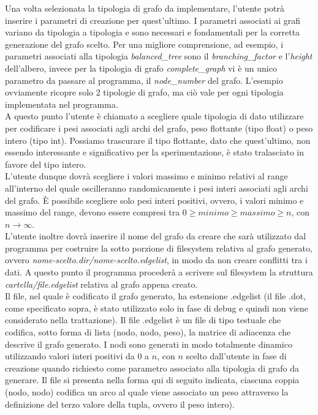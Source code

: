 Una volta selezionata la tipologia di grafo da implementare, l'utente potrà inserire i parametri di creazione per quest'ultimo. I parametri associati ai grafi variano da tipologia a tipologia e sono necessari e fondamentali per la corretta generazione del grafo scelto. Per una migliore comprensione, ad esempio, i parametri associati alla tipologia \textit{balanced\_tree} sono il \textit{branching\_factor} e l'\textit{height} dell'albero, invece per la tipologia di grafo \textit{complete\_graph} vi è un unico parametro da passare al programma, il \textit{node\_number} del grafo. L'esempio ovviamente ricopre solo 2 tipologie di grafo, ma ciò vale per ogni tipologia implementata nel programma.\\
A questo punto l'utente è chiamato a scegliere quale tipologia di dato utilizzare per codificare i pesi associati agli archi del grafo, peso flottante (tipo float) o peso intero (tipo int). Possiamo trascurare il tipo flottante, dato che quest'ultimo, non essendo interessante e significativo per la sperimentazione, è stato tralasciato in favore del tipo intero.\\
L'utente dunque dovrà scegliere i valori massimo e minimo relativi al range all'interno del quale oscilleranno randomicamente i pesi interi associati agli archi del grafo. È possibile scegliere solo pesi interi positivi, ovvero, i valori minimo e massimo del range, devono essere compresi tra \(0 \geq minimo \geq massimo \geq n\), con \(n\to\infty\).\\
L'utente inoltre dovrà inserire il nome del grafo da creare che sarà utilizzato dal programma per costruire la sotto porzione di filesystem relativa al grafo generato, ovvero \textit{nome-scelto.dir/nome-scelto.edgelist}, in modo da non creare conflitti tra i dati. A questo punto il programma procederà a scrivere sul filesystem la struttura \textit{cartella/file.edgelist} relativa al grafo appena creato.\\
Il file, nel quale è codificato il grafo generato, ha estensione .edgelist (il file .dot, come specificato sopra, è stato utilizzato solo in fase di debug e quindi non viene considerato nella trattazione). Il file .edgelist è un file di tipo testuale che codifica, sotto forma di lista (nodo, nodo, peso), la matrice di adiacenza che descrive il grafo generato. I nodi sono generati in modo totalmente dinamico utilizzando valori interi positivi da $0$ a $n$, con $n$ scelto dall'utente in fase di creazione quando richiesto come parametro associato alla tipologia di grafo da generare. Il file si presenta nella forma qui di seguito indicata, ciascuna coppia (nodo, nodo) codifica un arco al quale viene associato un peso attraverso la definizione del terzo valore della tupla, ovvero il peso intero).

